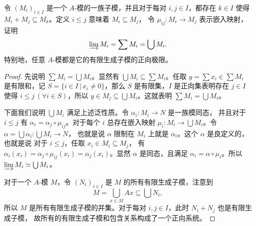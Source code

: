 \begin{problem}
  令 $(M_i)_{i\in I}$ 是一个 $A$-模的一族子模，并且对于每对 $i,j\in I$，都存在
  $k\in I$ 使得 $M_i+M_j\subseteq M_k$。定义 $i\leq j$ 意味着 $M_i\subseteq M_j$，
  令 $\mu_{ij}:M_i\to M_j$ 表示嵌入映射，证明
  \[
    \varinjlim M_i=\sum M_i=\bigcup M_i.  
  \]
  特别地，任意 $A$-模都是它的有限生成子模的正向极限。
\end{problem}
\begin{proof}
  先说明 $\sum M_i=\bigcup M_i$。显然有 $\bigcup M_i\subseteq \sum M_i$。任取
  $y=\sum x_i\in \sum M_i$ 是有限和，记 $S=\{i\in I\,|\, x_i\neq 0\}$，那么 $S$
  是有限集，$I$ 是正向集表明存在 $j\in I$ 使得 $i\leq j\ (\forall i\in S)$，所以
  $y\in M_j\subseteq\bigcup M_i$。这就表明 $\sum M_i=\bigcup M_i$。

  下面我们说明 $\bigcup M_i$ 满足上述泛性质。令 $\alpha_i:M_i\to N$ 是一族模同态，
  并且对于 $i\leq j$ 有 $\alpha_i=\alpha_j\circ\mu_{ij}$。对于每个 $i$
  总存在嵌入映射 $\mu_i:M_i\to \bigcup M_i$。令 $\alpha=\bigcup\alpha_i:\bigcup M_i\to N$，
  也就是说 $\alpha$ 限制在 $M_i$ 上就是 $\alpha_i$。这个 $\alpha$ 是良定义的，也就是说
  对于 $i\leq j$，任取 $x_i\in M_i\subseteq M_j$，
  有 $\alpha_i(x_i)=\alpha_j\circ\mu_{ij}(x_i)=\alpha_j(x_i)$。显然 $\alpha$ 是同态，且满足
  $\alpha_i=\alpha\circ\mu_i$。所以 $\varinjlim M_i\simeq\bigcup M_i$。

  对于一个 $A$-模 $M$，令 $(N_i)_{i\in I}$ 是 $M$ 的所有有限生成子模，注意到
  \[
    M=\bigcup_{x\in M} Ax\subseteq\bigcup N_i,  
  \]
  所以 $M$ 是所有有限生成子模的并集。对于每对 $i,j\in I$，此时 $N_i+N_j$ 也是有限生成子模，
  故所有的有限生成子模和包含关系构成了一个正向系统。
\end{proof}

\begin{problem}
  
\end{problem}

